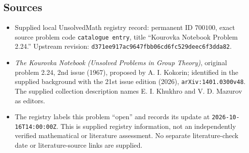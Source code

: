 \documentclass[11pt]{article}
\begin{document}
\subsection{Sources}
\begin{itemize}
\item Supplied local UnsolvedMath registry record: permanent ID \(700100\), exact source problem code \texttt{catalogue entry}, title ``Kourovka Notebook Problem 2.24.'' Upstream revision: \texttt{d371ee917ac9647fbb06cd6fc529deec6f3dda82}.
\item \emph{The Kourovka Notebook (Unsolved Problems in Group Theory)}, original problem 2.24, 2nd issue (1967), proposed by A. I. Kokorin; identified in the supplied background with the 21st issue edition (2026), \texttt{arXiv:1401.0300v48}. The supplied collection description names E. I. Khukhro and V. D. Mazurov as editors.
\item The registry labels this problem ``open'' and records its update at \texttt{2026-10-16T14:00:00Z}. This is supplied registry information, not an independently verified mathematical or literature assessment. No separate literature-check date or literature-source links are supplied.
\end{itemize}
\end{document}
